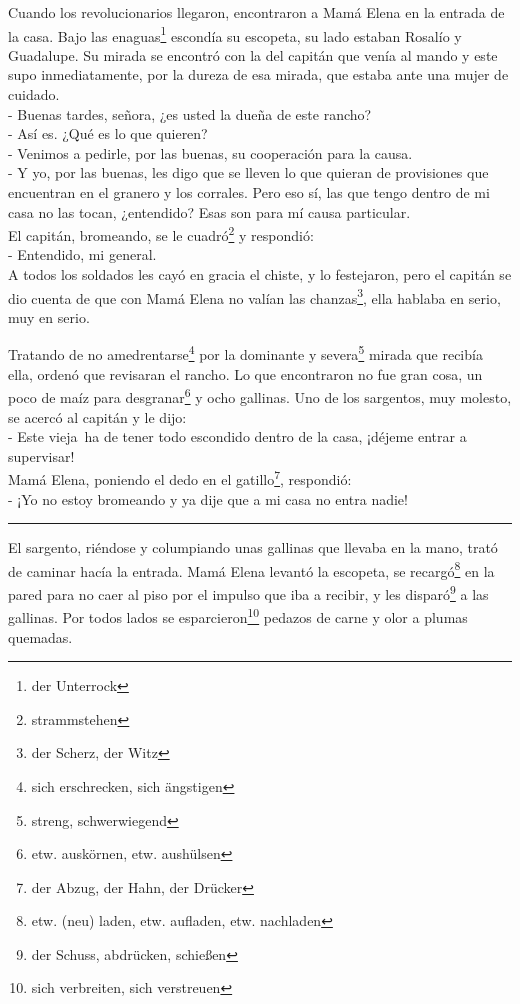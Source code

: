 Cuando los revolucionarios llegaron, encontraron a Mamá Elena en la
entrada de la casa. Bajo las enaguas\footnote{der Unterrock} escondía
su escopeta, su lado estaban Rosalío y Guadalupe. Su mirada se encontró con
la del capitán que venía al mando y este supo inmediatamente, por la dureza
de esa mirada, que estaba ante una mujer de cuidado.
\\- Buenas tardes, señora, ¿es usted la dueña de este rancho? %
\\- Así es. ¿Qué es lo que quieren? %
\\- Venimos a pedirle, por las buenas, su cooperación para la causa. %
\\- Y yo, por las buenas, les digo que se lleven lo que quieran de %
provisiones que encuentran en el granero y los corrales. Pero eso sí, %
las que tengo dentro de mi casa no las tocan, ¿entendido? Esas son para %
mí causa particular.\\

El capitán, bromeando, se le cuadró\footnote{strammstehen}
y respondió:
\\- Entendido, mi general.\\

A todos los soldados les cayó en gracia el chiste, y lo festejaron,
pero el capitán se dio cuenta de que con Mamá Elena no valían las chanzas\footnote{der Scherz, der Witz}, ella hablaba en serio,
muy en serio.

Tratando de no amedrentarse\footnote{sich erschrecken, sich ängstigen}
por la dominante y severa\footnote{streng, schwerwiegend} mirada que
recibía ella, ordenó que revisaran el rancho. Lo que encontraron no fue
gran cosa, un poco de maíz para desgranar\footnote{etw. auskörnen, etw. aushülsen}
y ocho gallinas. Uno de los sargentos, muy molesto, se acercó al capitán
y le dijo:
\\- Este vieja~ha de tener todo escondido dentro de la casa, ¡déjeme %
entrar a supervisar!\\

Mamá Elena, poniendo el dedo en el gatillo\footnote{der Abzug, der Hahn, der Drücker},
respondió:
\\- ¡Yo no estoy bromeando y ya dije que a mi casa no entra nadie! \\
\rule{1em}{0pt}El sargento, riéndose y columpiando unas gallinas que llevaba en la mano,
trató de caminar hacía la entrada. Mamá Elena levantó la escopeta, se recargó\footnote{etw. (neu) laden, etw. aufladen, etw. nachladen}
en la pared para no caer al piso por el impulso que iba a
recibir, y les disparó\footnote{der Schuss, abdrücken, schießen}
a las gallinas. Por todos lados se esparcieron\footnote{sich verbreiten, sich verstreuen}
pedazos de carne y olor a plumas quemadas.

